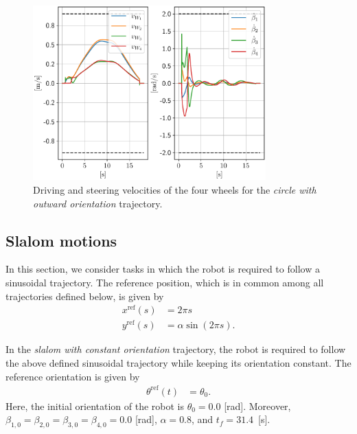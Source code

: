 \begin{figure}
    \centering
    \includegraphics[width=0.8\textwidth]{figures/SWMR/simulations/circular_with_outward_orientation/wheels_velocities.pdf}
    \caption{Driving and steering velocities of the four wheels for the \textit{circle with outward orientation} trajectory.}
    \label{fig:simulations:circle-with-outward-orientation:wheel-velocities}
\end{figure}

\subsection{Slalom motions}
In this section, we consider tasks in which the robot is required to follow a sinusoidal trajectory. The reference position, which is in common among all trajectories defined below, is given by
\begin{subequations}
\begin{align*}
    x^{\mathrm{ref}}(s) &= 2 \pi s \\
    y^{\mathrm{ref}}(s) &= \alpha \sin(2 \pi s).
\end{align*}
\end{subequations}

In the \textit{slalom with constant orientation} trajectory, the robot is required to follow the above defined sinusoidal trajectory while keeping its orientation constant. The reference orientation is given by
\begin{subequations}
\begin{align*}
    \theta^{\mathrm{ref}}(t) &= \theta_0.
\end{align*}
\end{subequations}
Here, the initial orientation of the robot is $\theta_0=0.0$ [rad]. Moreover, $\beta_{1,0}=\beta_{2,0}=\beta_{3,0}=\beta_{4,0}=0.0$ [rad], $\alpha=0.8$, and $t_f=31.4$~[s].

